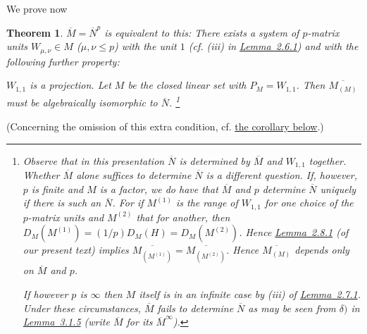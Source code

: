 \documentclass[b5paper,twoside]{article}
\makeatletter
\newcommand{\MvNSetCurrentLabel}[2]{%
  \edef\@currentlabel{#1}%
  \edef\@currentlabelname{#2}%
}
\newcommand{\MvNTargetLabel}[3]{%
  \phantomsection
  \begingroup
    \MvNSetCurrentLabel{#2}{#3}%
    \label{#1}%
  \endgroup
}
\newcommand{\FootnoteTarget}[1]{%
  \MvNTargetLabel{#1}{\thefootnote}{Footnote \thefootnote}}
\newcommand{\lemref}[2]{\hyperref[#1]{\mbox{Lemma~#2}}}
\theoremstyle{mvnplain}
\newtheorem{theorem}{Theorem}
\newcommand{\M}{\mathbf M}
\newcommand{\N}{\mathbf N}
\newcommand{\Hilbert}{\mathfrak H}
\def\M{M}%
\def\N{N}%
\def\Hilbert{H}%
\def\mathfrak#1{#1}%
\makeatother
\begin{document}
We prove now
\begin{theorem}\label{thm:V}
$\overline{\M}=\overline{\N}^{p}$ is equivalent to this: There exists a
system of $p$-matrix units $W_{\mu,\nu}\in\M$ ($\mu,\nu\leq p$) with the
unit $1$ (cf. (iii) in \lemref{lem:2.6.1}{2.6.1}) and with the following
further property:

$W_{1,1}$ is a projection.  Let $\mathfrak M$ be the closed linear set with
$P_{\mathfrak M}=W_{1,1}$.  Then $\overline{\M_{(\mathfrak M)}}$ must be
algebraically isomorphic to $\overline{\N}$.
\footnote{\FootnoteTarget{fn:15}Observe that in this presentation $\overline{\N}$ is determined
by $\overline{\M}$ and $W_{1,1}$ together.  Whether $\overline{\M}$ alone
suffices to determine $\overline{\N}$ is a different question.  If, however,
$p$ is finite and $\M$ is a factor, we do have that $\overline{\M}$ and $p$
determine $\overline{\N}$ uniquely if there is such an $\overline{\N}$.
For if $\mathfrak M^{(1)}$ is the range of $W_{1,1}$ for one choice of the
$p$-matrix units and $\mathfrak M^{(2)}$ that for another, then
$D_{\M}(\mathfrak M^{(1)})=(1/p)D_{\M}(\Hilbert)
=D_{\M}(\mathfrak M^{(2)})$.  Hence \lemref{lem:2.8.1}{2.8.1} (of our
present text) implies
$\overline{\M_{(\mathfrak M^{(1)})}}
=\overline{\M_{(\mathfrak M^{(2)})}}$.  Hence
$\overline{\M_{(\mathfrak M)}}$ depends only on $\overline{\M}$ and $p$.

If however $p$ is $\infty$ then $\M$ itself is in an infinite case by (iii)
of \lemref{lem:2.7.1}{2.7.1}.  Under these circumstances,
$\overline{\M}$ fails to determine $\overline{\N}$ as may be seen from
$\delta)$ in \lemref{lem:3.1.5}{3.1.5} (write $\overline{\M}$ for its
$\overline{\M}^{\infty}$).}
\end{theorem}
(Concerning the omission of this extra condition, cf.
\hyperref[cor:2.6.1]{the corollary below}.)
\end{document}
